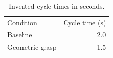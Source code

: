 \begin{table}
\caption{Invented cycle times in seconds.}
\label{tab:timing}
\begin{tabular}{lr}
Condition & Cycle time (s) \\
Baseline & 2.0 \\
Geometric grasp & 1.5 \\
\end{tabular}
\end{table}
